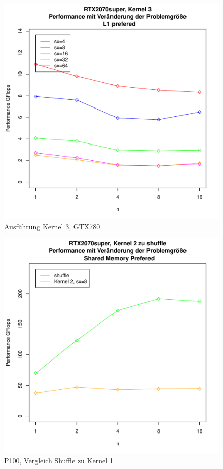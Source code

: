 \documentclass[10pt,a4paper]{article}
\begin{document}
	\begin{figure}
		\includegraphics[page=5,scale=0.8]{../Diagramme/onlyatomic_changei.pdf}
		
		\caption{Ausführung Kernel 3, GTX780 }
		\label{Ausführung Kernel3, GTX780 }
	\end{figure}
	\begin{figure}
		\includegraphics[page=2,scale=0.8]{../Diagramme/shuffle.pdf}
		
		\caption{P100, Vergleich Shuffle zu Kernel 1 }
		\label{Shuffle P100}
	\end{figure}
	
\end{document}
